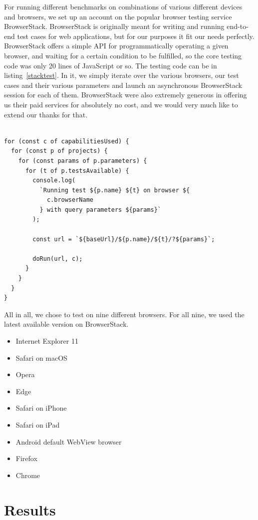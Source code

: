 \documentclass[conference]{IEEEtran}
\begin{document}
For running different benchmarks on combinations of various different
devices and browsers, we set up an account on the popular browser testing
service BrowserStack. BrowserStack is originally meant for writing and running
end-to-end test cases for web applications, but for our purposes it fit our
needs perfectly. BrowserStack offers a simple API for programmatically
operating a given browser, and waiting for a certain condition to be fulfilled,
so the core testing code was only 20 lines of JavaScript or so. The testing
code can be in listing~\ref{stacktest}. In it, we simply iterate over the
various browsers, our test cases and their various parameters and launch an
asynchronous BrowserStack session for each of them. BrowserStack were also
extremely generous in offering us their paid services for absolutely no cost,
and we would very much like to extend our thanks for that.

\begin{lstlisting}[caption={BrowserStack testing code},label=stacktest, basicstyle=\scriptsize]

for (const c of capabilitiesUsed) {
  for (const p of projects) {
    for (const params of p.parameters) {
      for (t of p.testsAvailable) {
        console.log(
          `Running test ${p.name} ${t} on browser ${
            c.browserName
          } with query parameters ${params}`
        );

        const url = `${baseUrl}/${p.name}/${t}/?${params}`;

        doRun(url, c);
      }
    }
  }
}
\end{lstlisting}

All in all, we chose to test on nine different browsers. For all nine, we used
the latest available version on BrowserStack.

\begin{itemize}
  \item Internet Explorer 11
  \item Safari on macOS
  \item Opera
  \item Edge
  \item Safari on iPhone
  \item Safari on iPad
  \item Android default WebView browser
  \item Firefox
  \item Chrome
\end{itemize}

\section{Results}
\end{document}
